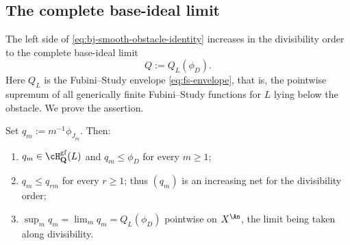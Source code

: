 \subsection{The complete base-ideal limit}
\label{sec:ch40-Q}

The left side of \eqref{eq:bj-smooth-obstacle-identity} increases in the
divisibility order to the complete base-ideal limit
\[
                            Q:=Q_L(\phi_D).
\tag{40.7}\label{eq:bj-smooth-Q}
\]
Here $Q_L$ is the Fubini--Study envelope \eqref{eq:fs-envelope}, that is,
the pointwise supremum of all generically finite Fubini--Study functions for
$L$ lying below the obstacle.  We prove the assertion.

\begin{proposition}
\label{prop:ch40-Q-limit}
Set $q_m:=m^{-1}\phi_{J_m}$.  Then:
\begin{enumerate}
\item\label{itm:ch40-Q:gf}
 $q_m\in\cH^{\mathrm{gf}}_{\mathbf Q}(L)$ and $q_m\le\phi_D$ for every
 $m\ge1$;
\item\label{itm:ch40-Q:increasing}
 $q_m\le q_{rm}$ for every $r\ge1$; thus $(q_m)$ is an increasing net
 for the divisibility order;
\item\label{itm:ch40-Q:sup}
 $\sup_mq_m=\lim_mq_m=Q_L(\phi_D)$ pointwise on $X^{\An}$, the limit
 being taken along divisibility.
\end{enumerate}
\end{proposition}

